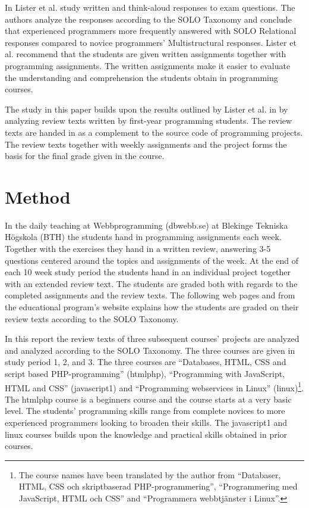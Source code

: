 \documentclass[twoside,twocolumn,a4paper,11pt,english]{article}
\begin{document}
In \cite{lister2006not} Lister et al. study written and think-aloud responses to exam questions. The authors analyze the responses according to the SOLO Taxonomy and conclude that experienced programmers more frequently answered with SOLO Relational responses compared to novice programmers' Multistructural responses. Lister et al. recommend that the students are given written assignments together with programming assignments. The written assignments make it easier to evaluate the understanding and comprehension the students obtain in programming courses.

The study in this paper builds upon the results outlined by Lister et al. in \cite{lister2006not} by analyzing review texts written by first-year programming students. The review texts are handed in as a complement to the source code of programming projects. The review texts together with weekly assignments and the project forms the basis for the final grade given in the course.




\section{Method}

In the daily teaching at Webbprogramming (dbwebb.se) at Blekinge Tekniska Högskola (BTH) the students hand in programming assignments each week. Together with the exercises they hand in a written review, answering 3-5 questions centered around the topics and assignments of the week. At the end of each 10 week study period the students hand in an individual project together with an extended review text. The students are graded both with regards to the completed assignments and the review texts. The following web pages \cite{redovisning} and \cite{solo} from the educational program's website explains how the students are graded on their review texts according to the SOLO Taxonomy.

In this report the review texts of three subsequent courses' projects are analyzed and analyzed according to the SOLO Taxonomy. The three courses are given in study period 1, 2, and 3. The three courses are ``Databases, HTML, CSS and script based PHP-programming'' (htmlphp), ``Programming with JavaScript, HTML and CSS'' (javascript1) and ``Programming webservices in Linux'' (linux)\footnote{The course names have been translated by the author from ``Databaser, HTML, CSS och skriptbaserad PHP-programmering'', ``Programmering med JavaScript, HTML och CSS'' and ``Programmera webbtjänster i Linux''.}. The htmlphp course is a beginners course and the course starts at a very basic level. The students' programming skills range from complete novices to more experienced programmers looking to broaden their skills. The javascript1 and linux courses builds upon the knowledge and practical skills obtained in prior courses.
\end{document}
